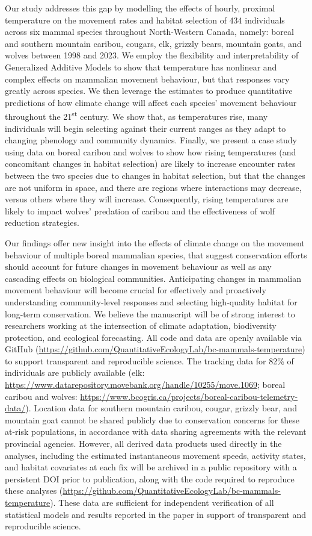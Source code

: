 \documentclass{article}
\begin{document}
Our study addresses this gap by modelling the effects of hourly, proximal temperature on the movement rates and habitat selection of 434 individuals across six mammal species throughout North-Western Canada, namely: boreal and southern mountain caribou, cougars, elk, grizzly bears, mountain goats, and wolves between 1998 and 2023. We employ the flexibility and interpretability of Generalized Additive Models to show that temperature has nonlinear and complex effects on mammalian movement behaviour, but that responses vary greatly across species. We then leverage the estimates to produce quantitative predictions of how climate change will affect each species' movement behaviour throughout the 21\textsuperscript{st} century. We show that, as temperatures rise, many individuals will begin selecting against their current ranges as they adapt to changing phenology and community dynamics. Finally, we present a case study using data on boreal caribou and wolves to show how rising temperatures (and concomitant changes in habitat selection) are likely to increase encounter rates between the two species due to changes in habitat selection, but that the changes are not uniform in space, and there are regions where interactions may decrease, versus others where they will increase. Consequently, rising temperatures are likely to impact wolves' predation of caribou and the effectiveness of wolf reduction strategies.

Our findings offer new insight into the effects of climate change on the movement behaviour of multiple boreal mammalian species, that suggest conservation efforts should account for future changes in movement behaviour as well as any cascading effects on biological communities. Anticipating changes in mammalian movement behaviour will become crucial for effectively and proactively understanding community-level responses and selecting high-quality habitat for long-term conservation. We believe the manuscript will be of strong interest to researchers working at the intersection of climate adaptation, biodiversity protection, and ecological forecasting. All code and data are openly available via GitHub (\url{https://github.com/QuantitativeEcologyLab/bc-mammals-temperature}) to support transparent and reproducible science. The tracking data for 82\% of individuals are publicly available (elk: \url{https://www.datarepository.movebank.org/handle/10255/move.1069}; boreal caribou and wolves: \url{https://www.bcogris.ca/projects/boreal-caribou-telemetry-data/}). Location data for southern mountain caribou, cougar, grizzly bear, and mountain goat cannot be shared publicly due to conservation concerns for these at-risk populations, in accordance with data sharing agreements with the relevant provincial agencies. However, all derived data products used directly in the analyses, including the estimated instantaneous movement speeds, activity states, and habitat covariates at each fix will be archived in a public repository with a persistent DOI prior to publication, along with the code required to reproduce these analyses (\url{https://github.com/QuantitativeEcologyLab/bc-mammals-temperature}). These data are sufficient for independent verification of all statistical models and results reported in the paper in support of transparent and reproducible science.
\end{document}
